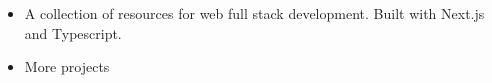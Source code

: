 \documentclass[]{rahulworld-resume}
\begin{document}
\begin{minipage}[t]{0.66\textwidth}
\begin{itemize}
  

    \item \href{https://github.com/jamerrq/resources-app}{} A collection of resources for web full stack development. Built with Next.js and Typescript.

    \item More projects \href{https://my-portfolio-jamerrq.netlify.app/#projects}{}

\end{itemize}

\end{minipage}
\end{document}
